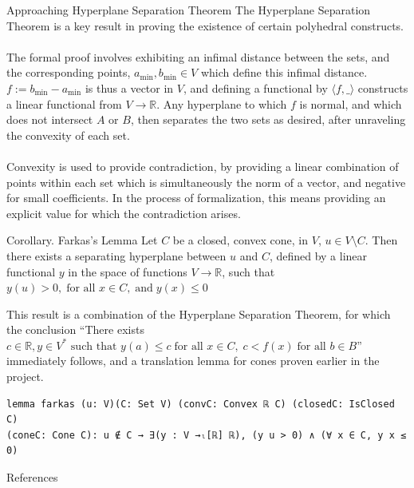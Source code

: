\documentclass[final]{beamer}
\newlength{\colwidth}
\begin{document}
\begin{frame}[fragile]
\begin{columns}[t]
\begin{column}{\colwidth}
        \begin{block}{Approaching Hyperplane Separation Theorem}
            The Hyperplane Separation Theorem is a key result in proving the existence of certain polyhedral constructs.
            \\\\The formal proof involves exhibiting an infimal distance between the sets, and the corresponding points, $a_{\text{min}}, b_{\text{min}} \in V$ which define this infimal distance.
            $f:= b_{\text{min}}-a_{\text{min}}$ is thus a vector in $V$, and defining a functional by $\langle f, \_\rangle$ constructs a linear functional from $V\to \mathbb{R}$. Any hyperplane to which $f$
            is normal, and which does not intersect $A$ or $B$, then separates the two sets as desired, after unraveling the convexity of each set.
            \\\\Convexity is used to provide contradiction, by providing a linear combination of points within each set which is simultaneously the norm of a vector,
            and negative for small coefficients. In the process of formalization, this means providing an explicit value for which the contradiction arises.         
        \end{block}
        
         
        \begin{exampleblock}{Corollary. Farkas's Lemma}
          Let $C$ be a closed, convex cone, in $V$, $u\in V\setminus C$. Then there exists a separating hyperplane between $u$ and $C$, defined by a linear functional $y$ in the space of functions $V\to \mathbb{R}$, such that $
          y(u)> 0, \; \text{for all } x\in C, \; \text{and} \; y(x) \le 0
          $
        \end{exampleblock}
            This result is  a combination of the Hyperplane Separation Theorem, for which the conclusion ``There exists $
              c\in \mathbb{R}, y \in V^* \text{ such that } y(a) \le c\; \text{for all } x\in C, \; c < f(x)\; \text{for all }  b\in B
            $'' immediately follows, and a translation lemma for cones proven earlier in the project.
\begin{Verbatim}
lemma farkas (u: V)(C: Set V) (convC: Convex ℝ C) (closedC: IsClosed C)
(coneC: Cone C): u ∉ C → ∃(y : V →ₗ[ℝ] ℝ), (y u > 0) ∧ (∀ x ∈ C, y x ≤ 0)
\end{Verbatim}  
           
            
        \begin{block}{References}
        \nocite{liunotes}
        \begin{bibdiv}
        \begin{biblist}
        \end{biblist}
        \end{bibdiv}
        \end{block}
\end{column}


\end{columns}
\end{frame}
\end{document}
